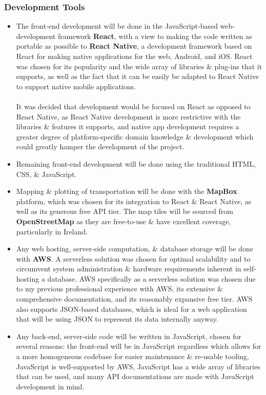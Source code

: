\documentclass[a4paper,11pt]{article}
\begin{document}
\subsubsection{Development Tools}
\begin{itemize}
    \item   The front-end development will be done in the JavaScript-based web-development framework \textbf{React}\supercite{react}, with a view to making the code written as portable as possible to \textbf{React Native}\supercite{native}, a development framework based on React for making native applications for the web, Android, and iOS.
        React was chosen for its popularity and the wide array of libraries \& plug-ins that it supports, as well as the fact that it can be easily be adapted to React Native to support native mobile applications.
        \\\\
        It was decided that development would be focused on React as opposed to React Native, as React Native development is more restrictive with the libraries \& features it supports, and native app development requires a greater degree of platform-specific domain knowledge \& development which could greatly hamper the development of the project.

    \item   Remaining front-end development will be done using the traditional HTML, CSS, \& JavaScript.

    \item   Mapping \& plotting of transportation will be done with the \textbf{MapBox}\supercite{mapbox} platform, which was chosen for its integration to React \& React Native, as well as its generous free API tier.
            The map tiles will be sourced from \textbf{OpenStreetMap}\supercite{osm} as they are free-to-use \& have excellent coverage, particularly in Ireland.

    \item   Any web hosting, server-side computation, \& database storage will be done with \textbf{AWS}\supercite{aws}.
            A serverless solution was chosen for optimal scalability and to circumvent system administration \& hardware requirements inherent in self-hosting a database.
            AWS specifically as a serverless solution was chosen due to my previous professional experience with AWS, its extensive \& comprehensive documentation, and its reasonably expansive free tier.
            AWS also supports JSON-based databases, which is ideal for a web application that will be using JSON to represent its data internally anyway.

    \item   Any back-end, server-side code will be written in JavaScript, chosen for several reasons: the front-end will be in JavaScript regardless which allows for a more homogeneous codebase for easier maintenance \& re-usable tooling, JavaScript is well-supported by AWS, JavaScript has a wide array of libraries that can be used, and many API documentations are made with JavaScript development in mind. 
\end{itemize}
\end{document}
